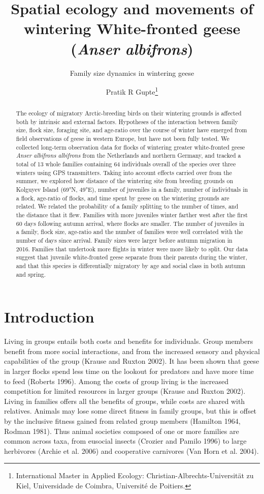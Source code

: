 \documentclass[10pt,twocolumn]{paper}
\title{Spatial ecology and movements of wintering White-fronted geese
(\emph{Anser albifrons})}
\subtitle{Family size dynamics in wintering geese}
\author{Pratik R Gupte\thanks{International Master in Applied Ecology: Christian-Albrechts-Universit\"{a}t zu Kiel, Universidade de Coimbra, Universit\'{e} de Poitiers.}}
\date{}
\begin{document}
\maketitle
\begin{abstract}
The ecology of migratory Arctic-breeding birds on their wintering
grounds is affected both by intrinsic and external factors. Hypotheses
of the interaction between family size, flock size, foraging site, and
age-ratio over the course of winter have emerged from field observations
of geese in western Europe, but have not been fully tested. We collected
long-term observation data for flocks of wintering greater white-fronted
geese \emph{Anser albifrons albifrons} from the Netherlands and northern
Germany, and tracked a total of 13 whole families containing 64
individuals overall of the species over three winters using GPS
transmitters. Taking into account effects carried over from the summer,
we explored how distance of the wintering site from breeding grounds on
Kolguyev Island (69°N, 49°E), number of juveniles in a family, number of
individuals in a flock, age-ratio of flocks, and time spent by geese on
the wintering grounds are related. We related the probability of a
family splitting to the number of times, and the distance that it flew.
Families with more juveniles winter farther west after the first 60 days
following autumn arrival, where flocks are smaller. The number of
juveniles in a family, flock size, age-ratio and the number of families
were well correlated with the number of days since arrival. Family sizes
were larger before autumn migration in 2016. Families that undertook
more flights in winter were more likely to split. Our data suggest that
juvenile white-fronted geese separate from their parents during the
winter, and that this species is differentially migratory by age and
social class in both autumn and spring.

\end{abstract}

\section{Introduction}\label{introduction}

Living in groups entails both costs and benefits for individuals. Group
members benefit from more social interactions, and from the increased
sensory and physical capabilities of the group (Krause and Ruxton 2002).
It has been shown that geese in larger flocks spend less time on the
lookout for predators and have more time to feed (Roberts 1996). Among
the costs of group living is the increased competition for limited
resources in larger groups (Krause and Ruxton 2002). Living in families
offers all the benefits of groups, while costs are shared with
relatives. Animals may lose some direct fitness in family groups, but
this is offset by the inclusive fitness gained from related group
members (Hamilton 1964, Rodman 1981). Thus animal societies composed of
one or more families are common across taxa, from eusocial insects
(Crozier and Pamilo 1996) to large herbivores (Archie et al. 2006) and
cooperative carnivores (Van Horn et al. 2004).
\end{document}
